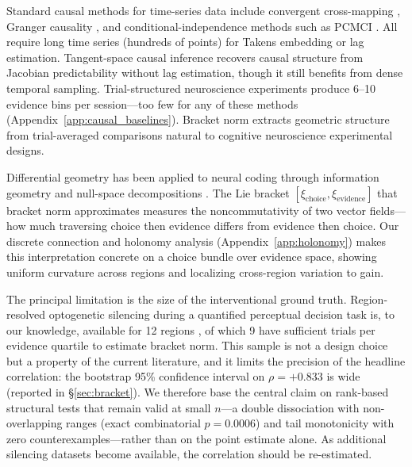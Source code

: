 \documentclass[9pt,lineno]{elife}
\begin{document}
Standard causal methods for time-series data include convergent cross-mapping \citep{sugihara2012detecting}, Granger causality \citep{granger1969investigating}, and conditional-independence methods such as PCMCI \citep{runge2019detecting}. All require long time series (hundreds of points) for Takens embedding or lag estimation. Tangent-space causal inference \citep{butler2024tsci} recovers causal structure from Jacobian predictability without lag estimation, though it still benefits from dense temporal sampling. Trial-structured neuroscience experiments produce 6--10 evidence bins per session---too few for any of these methods (Appendix~\ref{app:causal_baselines}). Bracket norm extracts geometric structure from trial-averaged comparisons natural to cognitive neuroscience experimental designs.

Differential geometry has been applied to neural coding through information geometry \citep{amari2016information} and null-space decompositions \citep{kaufman2014cortical}. The Lie bracket $[\xi_{\text{choice}}, \xi_{\text{evidence}}]$ that bracket norm approximates measures the noncommutativity of two vector fields---how much traversing choice then evidence differs from evidence then choice. Our discrete connection and holonomy analysis (Appendix~\ref{app:holonomy}) makes this interpretation concrete on a choice bundle over evidence space, showing uniform curvature across regions and localizing cross-region variation to gain.

The principal limitation is the size of the interventional ground truth. Region-resolved optogenetic silencing during a quantified perceptual decision task is, to our knowledge, available for 12 regions \citep{steinmetz2019distributed, zatkahaas2021}, of which 9 have sufficient trials per evidence quartile to estimate bracket norm. This sample is not a design choice but a property of the current literature, and it limits the precision of the headline correlation: the bootstrap 95\% confidence interval on $\rho = +0.833$ is wide (reported in \S\ref{sec:bracket}). We therefore base the central claim on rank-based structural tests that remain valid at small $n$---a double dissociation with non-overlapping ranges (exact combinatorial $p = 0.0006$) and tail monotonicity with zero counterexamples---rather than on the point estimate alone. As additional silencing datasets become available, the correlation should be re-estimated.
\end{document}
